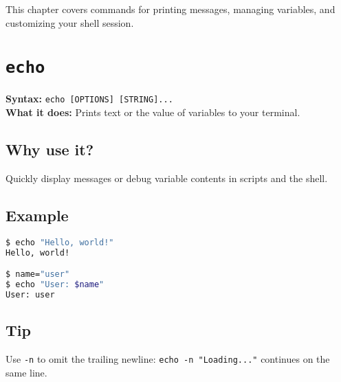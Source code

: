 \documentclass[10pt,oneside]{scrbook}
\begin{document}
This chapter covers commands for printing messages, managing variables, and customizing your shell session.

\section{\texttt{echo}}
\begin{cmdbox}
  \textbf{Syntax:} \lstinline!echo [OPTIONS] [STRING]...! \\
  \textbf{What it does:} Prints text or the value of variables to your terminal.
\end{cmdbox}
\begin{commanddetails}
  \subsection*{Why use it?}
    Quickly display messages or debug variable contents in scripts and the shell.

  \subsection*{Example}
  \begin{lstlisting}[language=bash]
$ echo "Hello, world!"
Hello, world!

$ name="user"
$ echo "User: $name"
User: user
  \end{lstlisting}

  \subsection*{Tip}
    Use \lstinline!-n! to omit the trailing newline:
    \lstinline!echo -n "Loading..."! continues on the same line.
\end{commanddetails}

\end{document}
